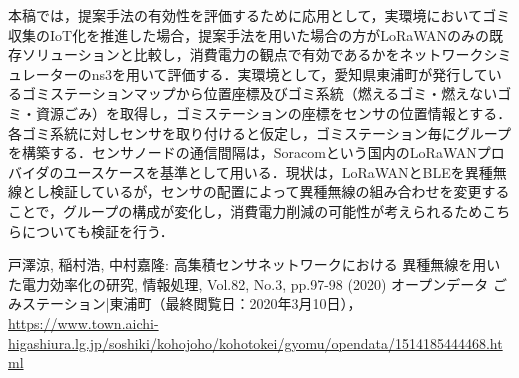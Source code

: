 \documentclass[Japanese]{dicomopapers}
\begin{document}
\par
本稿では，提案手法の有効性を評価するために応用として，実環境においてゴミ収集のIoT化を推進した場合，提案手法を用いた場合の方がLoRaWANのみの既存ソリューションと比較し，消費電力の観点で有効であるかをネットワークシミュレーターのns3を用いて評価する．実環境として，愛知県東浦町が発行しているゴミステーションマップから位置座標及びゴミ系統（燃えるゴミ・燃えないゴミ・資源ごみ）を取得し，ゴミステーションの座標をセンサの位置情報とする．各ゴミ系統に対しセンサを取り付けると仮定し，ゴミステーション毎にグループを構築する．センサノードの通信間隔は，Soracomという国内のLoRaWANプロバイダのユースケース\cite{garbage_station}を基準として用いる．現状は，LoRaWANとBLEを異種無線とし検証しているが，センサの配置によって異種無線の組み合わせを変更することで，グループの構成が変化し，消費電力削減の可能性が考えられるためこちらについても検証を行う．

\begin{table}[h]
    \centering
    \caption{LoRaWANのユースケース}\label{fig:LoRaWAN_Usecase}
\end{table}

\begin{thebibliography}{4}
     戸澤涼, 稲村浩, 中村嘉隆:  高集積センサネットワークにおける 異種無線を用いた電力効率化の研究, 情報処理, Vol.82, No.3, pp.97-98 (2020)
     オープンデータ ごみステーション|東浦町（最終閲覧日：2020年3月10日），\url{https://www.town.aichi-higashiura.lg.jp/soshiki/kohojoho/kohotokei/gyomu/opendata/1514185444468.html}
\end{thebibliography}
\end{document}
